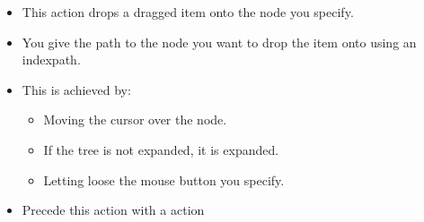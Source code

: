 
\begin{itemize}
\item This action drops a dragged item onto the node you specify. 
\item You give the path to the node you want to drop the item onto using an indexpath. 
\item This is achieved by:
\begin{itemize}
\item Moving the cursor over the node.
\item If the tree is not expanded, it is expanded.
\item Letting loose the mouse button you specify. 
\end{itemize}
\item Precede this action with a  action
\end{itemize}
